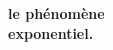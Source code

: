 \documentclass[preview]{standalone}
\begin{document}
\begin{center}
\textbf{le ph\'enom\`ene} \\ \textbf{exponentiel.}
\end{center}
\end{document}
